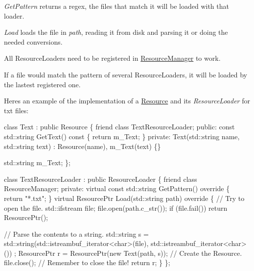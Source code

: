 {\itshape Get\+Pattern} returns a regex, the files that match it will be loaded with that loader.

{\itshape Load} loads the file in {\itshape path}, reading it from disk and parsing it or doing the needed conversions.

All Resource\+Loaders need to be registered in \hyperlink{classTarbora_1_1ResourceManager}{Resource\+Manager} to work.

If a file would match the pattern of several Resource\+Loaders, it will be loaded by the lastest registered one.

Here\textquotesingle{}s an example of the implementation of a \hyperlink{classTarbora_1_1Resource}{Resource} and its {\itshape Resource\+Loader} for txt files\+:


\begin{DoxyCode}
\textcolor{keyword}{class }Text : \textcolor{keyword}{public} Resource
\{
    \textcolor{keyword}{friend} \textcolor{keyword}{class }TextResourceLoader;
\textcolor{keyword}{public}:
    \textcolor{keyword}{const} std::string GetText()\textcolor{keyword}{ const }\{ \textcolor{keywordflow}{return} m\_Text; \}
\textcolor{keyword}{private}:
    Text(std::string name, std::string text) : Resource(name), m\_Text(text) \{\}

    std::string m\_Text;
\};

\textcolor{keyword}{class }TextResourceLoader : \textcolor{keyword}{public} ResourceLoader
\{
    \textcolor{keyword}{friend} \textcolor{keyword}{class }ResourceManager;
\textcolor{keyword}{private}:
    \textcolor{keyword}{virtual} \textcolor{keyword}{const} std::string GetPattern()\textcolor{keyword}{ override }\{ \textcolor{keywordflow}{return} \textcolor{stringliteral}{"*.txt"}; \}
    \textcolor{keyword}{virtual} ResourcePtr Load(std::string path)\textcolor{keyword}{ override}
\textcolor{keyword}{    }\{
        \textcolor{comment}{// Try to open the file.}
        std::ifstream file;
        file.open(path.c\_str());
        \textcolor{keywordflow}{if} (file.fail())
            \textcolor{keywordflow}{return} ResourcePtr();

        \textcolor{comment}{// Parse the contents to a string.}
        std::string s = std::string(std::istreambuf\_iterator<char>(file), std::istreambuf\_iterator<char>())
      ;
        ResourcePtr r = ResourcePtr(\textcolor{keyword}{new} Text(path, s)); \textcolor{comment}{// Create the Resource.}
        file.close(); \textcolor{comment}{// Remember to close the file!}
        \textcolor{keywordflow}{return} r;
    \}
\};
\end{DoxyCode}


